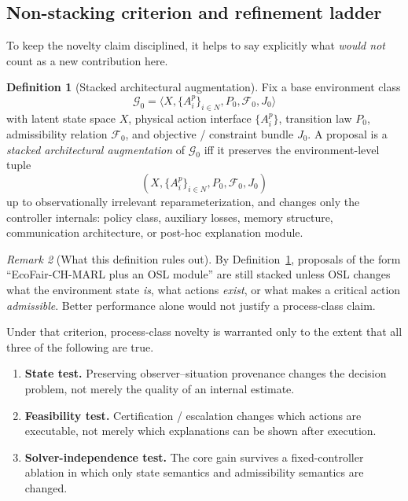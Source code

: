 \documentclass[11pt]{article}
\newcommand{\1}{\mathbf{1}}
\theoremstyle{definition}
\newtheorem{definition}{Definition}[section]
\theoremstyle{plain}
\theoremstyle{remark}
\newtheorem{remark}[definition]{Remark}
\begin{document}
\subsection{Non-stacking criterion and refinement ladder}

To keep the novelty claim disciplined, it helps to say explicitly what \emph{would not} count as a new contribution here.

\begin{definition}[Stacked architectural augmentation]
\label{supp:def:stacking}
Fix a base environment class
\[
\mathcal G_0 = \langle X,\{A_i^p\}_{i\in N},P_0,\mathcal F_0,J_0\rangle
\]
with latent state space $X$, physical action interface $\{A_i^p\}$, transition law $P_0$, admissibility relation $\mathcal F_0$, and objective / constraint bundle $J_0$. A proposal is a \emph{stacked architectural augmentation} of $\mathcal G_0$ iff it preserves the environment-level tuple
\[
(X,\{A_i^p\}_{i\in N},P_0,\mathcal F_0,J_0)
\]
up to observationally irrelevant reparameterization, and changes only the controller internals: policy class, auxiliary losses, memory structure, communication architecture, or post-hoc explanation module.
\end{definition}

\begin{remark}[What this definition rules out]
\label{supp:rem:what-stacking-rules-out}
By Definition~\ref{supp:def:stacking}, proposals of the form ``EcoFair-CH-MARL plus an OSL module'' are still stacked unless OSL changes what the environment state \emph{is}, what actions \emph{exist}, or what makes a critical action \emph{admissible}. Better performance alone would not justify a process-class claim.
\end{remark}

Under that criterion, process-class novelty is warranted only to the extent that all three of the following are true.

\begin{enumerate}[leftmargin=1.7em,label=\textbf{R\arabic*:}]
\item \textbf{State test.} Preserving observer--situation provenance changes the decision problem, not merely the quality of an internal estimate.
\item \textbf{Feasibility test.} Certification / escalation changes which actions are executable, not merely which explanations can be shown after execution.
\item \textbf{Solver-independence test.} The core gain survives a fixed-controller ablation in which only state semantics and admissibility semantics are changed.
\end{enumerate}
\end{document}

